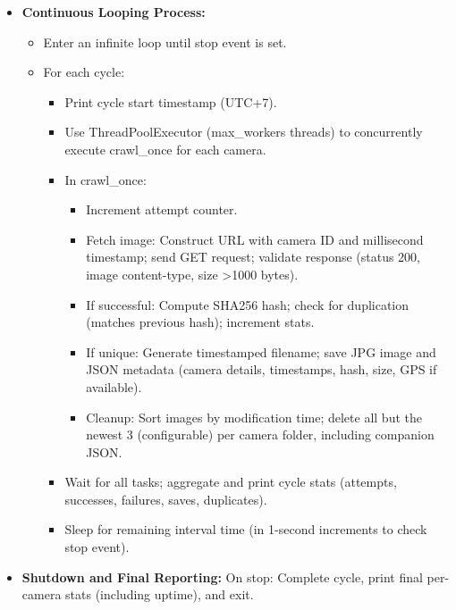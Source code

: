 \begin{itemize}
\item \textbf{Continuous Looping Process:}
\begin{itemize}
\item Enter an infinite loop until stop event is set.
\item For each cycle:
\begin{itemize}
\item Print cycle start timestamp (UTC+7).
\item Use ThreadPoolExecutor (max\_workers threads) to concurrently execute crawl\_once for each camera.
\item In crawl\_once:
\begin{itemize}
\item Increment attempt counter.
\item Fetch image: Construct URL with camera ID and millisecond timestamp; send GET request; validate response (status 200, image content-type, size >1000 bytes).
\item If successful: Compute SHA256 hash; check for duplication (matches previous hash); increment stats.
\item If unique: Generate timestamped filename; save JPG image and JSON metadata (camera details, timestamps, hash, size, GPS if available).
\item Cleanup: Sort images by modification time; delete all but the newest 3 (configurable) per camera folder, including companion JSON.
\end{itemize}
\item Wait for all tasks; aggregate and print cycle stats (attempts, successes, failures, saves, duplicates).
\item Sleep for remaining interval time (in 1-second increments to check stop event).
\end{itemize}   
\end{itemize}

\item \textbf{Shutdown and Final Reporting:}
On stop: Complete cycle, print final per-camera stats (including uptime), and exit.
\end{itemize}

